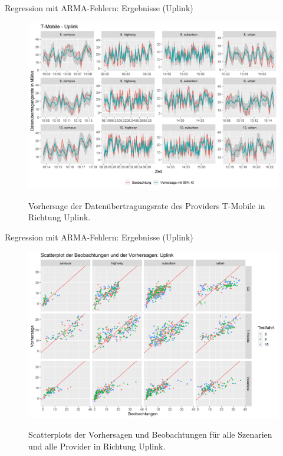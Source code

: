 \begin{frame}{Regression mit ARMA-Fehlern: Ergebnisse (Uplink)}
	\begin{figure}
		\centering
		\includegraphics[scale=0.38]{plots/arima/uplink/tmobile_predictions}\\
		\caption{Vorhersage der Datenübertragungsrate des Providers T-Mobile in Richtung Uplink.}
		\label{tmobile_predictions_ul}
	\end{figure}
\end{frame}

\begin{frame}{Regression mit ARMA-Fehlern: Ergebnisse (Uplink)}
	\begin{figure}
		\centering
		\includegraphics[scale=0.38]{plots/arima/uplink/scatter_colored_axes_fixed}\\
		\caption{Scatterplots der Vorhersagen und Beobachtungen für alle Szenarien und alle Provider in Richtung Uplink.}
		\label{arima_scatter_ul}
	\end{figure}
\end{frame}

